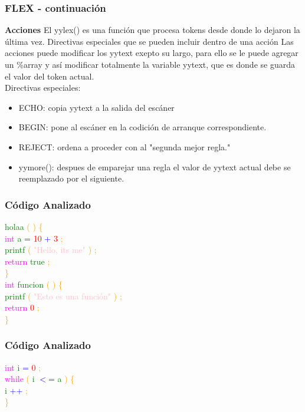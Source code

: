 \documentclass{beamer}
\begin{document}
\begin{frame}
\frametitle{FLEX - continuaci\'on} 
\textbf{Acciones} \newline 
El yylex() es una funci\'on que procesa tokens desde donde lo dejaron la \'ultima vez. Directivas especiales que se pueden incluir dentro de una acci\'on \newline 
Las acciones puede modificar los yytext exepto su largo, para ello se le puede agregar un \%array y as\'i modificar totalmente la variable yytext, que es donde se guarda el valor del token actual.\\Directivas especiales:\begin{itemize} \item ECHO: copia yytext a la salida del esc\'aner  \item BEGIN: pone al esc\'aner en la codici\'on de arranque correspondiente. \item REJECT: ordena a proceder con al "segunda mejor regla." \item yymore(): despues de emparejar una regla el valor de yytext actual debe se reemplazado por el siguiente.\end{itemize}\end{frame}
\begin{frame}
\frametitle{C\'odigo Analizado}
\textcolor{green}{holaa} \textcolor{orange}{(} \textcolor{orange}{)} \textcolor{orange}{\{} \\ 
 \textcolor{magenta}{int} \textcolor{green}{a} \textcolor{blue}{=} \textcolor{red}{10} \textcolor{blue}{+} \textcolor{red}{3} \textcolor{orange}{;} \\ 
 \textcolor{green}{printf} \textcolor{orange}{(} \textcolor{pink}{"Hello, its me"} \textcolor{orange}{)} \textcolor{orange}{;} \\ 
 \textcolor{magenta}{return} \textcolor{green}{true} \textcolor{orange}{;} \\ 
 \textcolor{orange}{\}} \\ 
 \textcolor{magenta}{int} \textcolor{green}{funcion} \textcolor{orange}{(} \textcolor{orange}{)} \textcolor{orange}{\{} \\ 
 \textcolor{green}{printf} \textcolor{orange}{(} \textcolor{pink}{"Esto es una función"} \textcolor{orange}{)} \textcolor{orange}{;} \\ 
 \textcolor{magenta}{return} \textcolor{red}{0} \textcolor{orange}{;} \\ 
 \textcolor{orange}{\}} \\ 
 \end{frame}
\begin{frame}
\frametitle{C\'odigo Analizado}
\textcolor{magenta}{int} \textcolor{green}{i} \textcolor{blue}{=} \textcolor{red}{0} \textcolor{orange}{;} \\ 
 \textcolor{magenta}{while} \textcolor{orange}{(} \textcolor{green}{i} \textcolor{blue}{$<$=} \textcolor{green}{a} \textcolor{orange}{)} \textcolor{orange}{\{} \\ 
 \textcolor{green}{i} \textcolor{blue}{++} \textcolor{orange}{;} \\ 
 \textcolor{orange}{\}} \\ 
 \textcolor{white}{} \end{frame}
\end{document}
